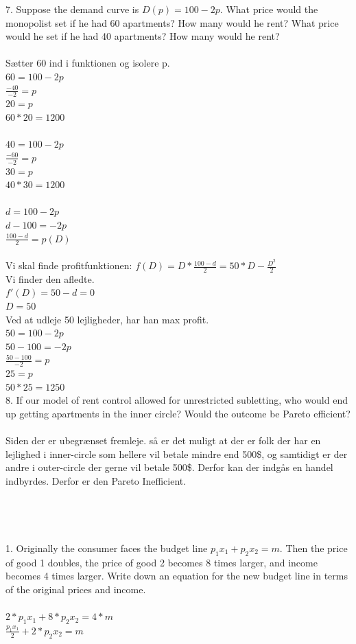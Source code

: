 \documentclass{article}
\begin{document}
7. Suppose the demand curve is $D(p) = 100-2p$. What price would the monopolist set if he had 60 apartments? How many would he rent? What price would he set if he had 40 apartments? How many would he rent? \\ \\
Sætter 60 ind i funktionen og isolere p. \\
$60=100-2p$ \\
$\frac{-40}{-2}=p$ \\
$20=p$ \\ 
$60*20=1200$ \\ \\
$40=100-2p$ \\
$\frac{-60}{-2}=p$ \\
$30=p$ \\
$40*30=1200$ \\ \\
$d=100-2p$ \\ 
$d-100=-2p$ \\
$\frac{100-d}{2}=p(D)$ \\ \\
Vi skal finde profitfunktionen:
$f(D)=D*\frac{100-d}{2} = 50*D-\frac{D^2}{2}$ \\
Vi finder den afledte. \\
$f'(D)=50-d=0$ \\
$D=50$ \\
Ved at udleje 50 lejligheder, har han max profit. \\
$50=100-2p$ \\
$50-100=-2p$ \\
$\frac{50-100}{-2}=p$\\
$25=p$ \\
$50*25=1250$ \\


8. If our model of rent control allowed for unrestricted subletting, who would end up getting apartments in the inner circle? Would the outcome be Pareto efficient? \\ \\
Siden der er ubegrænset fremleje. så er det muligt at der er folk der har en lejlighed i inner-circle som hellere vil betale mindre end 500\$, og samtidigt er der andre i outer-circle der gerne vil betale 500\$. Derfor kan der indgås en handel indbyrdes. Derfor er den Pareto Inefficient. \\
\\ \\ \\ \\
1. Originally the consumer faces the budget line $p_1x_1 + p_2x_2 = m$. Then the price of good 1 doubles, the price of good 2 becomes 8 times larger, and income becomes 4 times larger. Write down an equation for the new budget line in terms of the original prices and income. \\ \\
$2*p_1x_1 + 8*p_2x_2 = 4*m$ \\
$\frac{p_1x_1}{2} + 2*p_2x_2 = m$ \\
\end{document}
